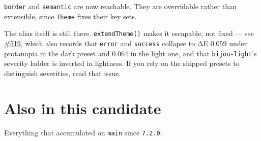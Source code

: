 \texttt{b\allowbreak{}o\allowbreak{}r\allowbreak{}d\allowbreak{}e\allowbreak{}r} and \texttt{s\allowbreak{}e\allowbreak{}m\allowbreak{}a\allowbreak{}n\allowbreak{}t\allowbreak{}i\allowbreak{}c} are now reachable. They are overridable rather than extensible, since \texttt{T\allowbreak{}h\allowbreak{}e\allowbreak{}m\allowbreak{}e} fixes their key sets.

The alias itself is still there. \texttt{e\allowbreak{}x\allowbreak{}t\allowbreak{}e\allowbreak{}n\allowbreak{}d\allowbreak{}T\allowbreak{}h\allowbreak{}e\allowbreak{}m\allowbreak{}e\allowbreak{}(\allowbreak{})} makes it escapable, not fixed --- see \href{https://github.com/flyingrobots/bijou/issues/519}{\#519}, which also records that \texttt{e\allowbreak{}r\allowbreak{}r\allowbreak{}o\allowbreak{}r} and \texttt{s\allowbreak{}u\allowbreak{}c\allowbreak{}c\allowbreak{}e\allowbreak{}s\allowbreak{}s} collapse to ΔE 0.059 under protanopia in the dark preset and 0.064 in the light one, and that \texttt{b\allowbreak{}i\allowbreak{}j\allowbreak{}o\allowbreak{}u\allowbreak{}-\allowbreak{}l\allowbreak{}i\allowbreak{}g\allowbreak{}h\allowbreak{}t}'s severity ladder is inverted in lightness. If you rely on the shipped presets to distinguish severities, read that issue.

\section{Also in this candidate}\label{record-284-also-in-this-candidate}

Everything that accumulated on \texttt{m\allowbreak{}a\allowbreak{}i\allowbreak{}n} since \texttt{7\allowbreak{}.\allowbreak{}2\allowbreak{}.\allowbreak{}0}:

